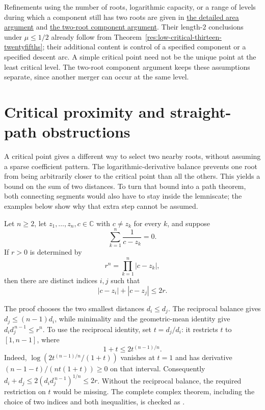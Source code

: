 \documentclass[11pt]{article}
\begin{document}
Refinements using the number of roots, logarithmic capacity, or a range
of levels during which a component still has two roots are given in
\href{https://github.com/wcook04/plectis-erdos/blob/f36a98bf3d3e6f65f1074e3b800e3293d5b8a51a/ErdosProblems/Erdos1041/UnconditionalConstantFactorBound.md}{the detailed area argument} and
\href{https://github.com/wcook04/plectis-erdos/blob/f36a98bf3d3e6f65f1074e3b800e3293d5b8a51a/ErdosProblems/Erdos1041/MinimalHubWindowJoin.md}{the two-root component argument}.
Their length-$2$ conclusions under $\mu\le1/2$ already follow from
Theorem~\ref{res:low-critical-thirteen-twentyfifths}; their additional content
is control of a specified component or a specified descent arc.
A simple critical point need not be the unique point at the least
critical level. The two-root component argument keeps these assumptions
separate, since another merger can occur at the same level.

\section{Critical proximity and straight-path obstructions}
\label{sec:critical-proximity}

A critical point gives a different way to select two nearby roots, without
assuming a sparse coefficient pattern.  The logarithmic-derivative balance
prevents one root from being arbitrarily closer to the critical point than
all the others.  This yields a bound on the sum of two distances.  To turn
that bound into a path theorem, both connecting segments would also have to
stay inside the lemniscate; the examples below show why that extra step
cannot be assumed.

\begin{theorem}
\label{res:critical-proximity}
Let $n\ge2$, let $z_1,\ldots,z_n,c\in\mathbb C$ with $c\ne z_k$ for every
$k$, and suppose
\[
  \sum_{k=1}^n\frac1{c-z_k}=0.
\]
If $r>0$ is determined by
\[
  r^n=\prod_{k=1}^n|c-z_k|,
\]
then there are distinct indices $i,j$ such that
\[
  |c-z_i|+|c-z_j|\le2r.
\]
\end{theorem}

\noindent The proof chooses the two smallest distances $d_i\le d_j$.
The reciprocal balance gives $d_j\le(n-1)d_i$, while minimality and the
geometric-mean identity give
$d_i d_j^{\,n-1}\le r^n$.  To use the reciprocal identity, set
$t=d_j/d_i$: it restricts $t$ to $[1,n-1]$, where
\[
 1+t\le2t^{(n-1)/n}.
\]
Indeed, $\log(2t^{(n-1)/n}/(1+t))$ vanishes at $t=1$ and has derivative
$(n-1-t)/(nt(1+t))\ge0$ on that interval.  Consequently
$d_i+d_j\le2(d_i d_j^{\,n-1})^{1/n}\le2r$.
Without the reciprocal balance, the required restriction on $t$ would be
missing.  The complete complex theorem,
including the choice of two indices and both inequalities, is checked as
.
\end{document}
